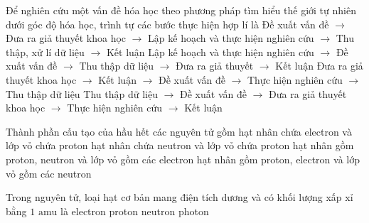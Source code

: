 \begin{ex}
    Để nghiên cứu một vấn đề hóa học theo phương pháp tìm hiểu thế giới tự nhiên dưới góc độ hóa học, trình tự các bước thực hiện hợp lí là
    \choice
    {\True Đề xuất vấn đề $\rightarrow$ Đưa ra giả thuyết khoa học $\rightarrow$ Lập kế hoạch và thực hiện nghiên cứu $\rightarrow$ Thu thập, xử lí dữ liệu $\rightarrow$ Kết luận}
    {Lập kế hoạch và thực hiện nghiên cứu $\rightarrow$ Đề xuất vấn đề $\rightarrow$ Thu thập dữ liệu $\rightarrow$ Đưa ra giả thuyết $\rightarrow$ Kết luận}
    {Đưa ra giả thuyết khoa học $\rightarrow$ Kết luận $\rightarrow$ Đề xuất vấn đề $\rightarrow$ Thực hiện nghiên cứu $\rightarrow$ Thu thập dữ liệu}
    {Thu thập dữ liệu $\rightarrow$ Đề xuất vấn đề $\rightarrow$ Đưa ra giả thuyết khoa học $\rightarrow$ Thực hiện nghiên cứu $\rightarrow$ Kết luận}
\end{ex}

\begin{ex}
    Thành phần cấu tạo của hầu hết các nguyên tử gồm
    \choice
    {hạt nhân chứa electron và lớp vỏ chứa proton}
    {hạt nhân chứa neutron và lớp vỏ chứa proton}
    {\True hạt nhân gồm proton, neutron và lớp vỏ gồm các electron}
    {hạt nhân gồm proton, electron và lớp vỏ gồm các neutron}
\end{ex}

\begin{ex}
    Trong nguyên tử, loại hạt cơ bản mang điện tích dương và có khối lượng xấp xỉ bằng $1\text{ amu}$ là
    \choice
    {electron}
    {\True proton}
    {neutron}
    {photon}
\end{ex}

